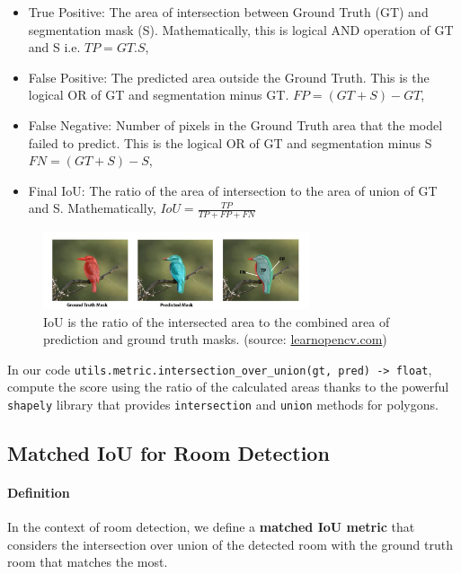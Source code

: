 \documentclass[11pt]{article}
\begin{document}
\begin{itemize}
    \item True Positive: The area of intersection between Ground Truth (GT) and segmentation mask (S). Mathematically, this is logical AND operation of GT and S i.e.
    $TP = GT.S$,
    \item False Positive: The predicted area outside the Ground Truth. This is the logical OR of GT and segmentation minus GT.
    $FP=(GT+S) - GT$,
    \item False Negative: Number of pixels in the Ground Truth area that the model failed to predict. This is the logical OR of GT and segmentation minus S
    $FN=(GT+S) -S$,
    \item Final IoU: The ratio of the area of intersection to the area of union of GT and S. Mathematically,
    $IoU = \frac{TP}{TP+FP+FN}$
\end{itemize}

\begin{figure}[hb!]
    \centering
    \includegraphics[width=0.7\textwidth]{figures/5-segmentation-iou.jpg}
    \caption{IoU is the ratio of the intersected area to the combined area of
     prediction and ground truth masks. 
     (source: \href{https://learnopencv.com/intersection-over-union-iou-in-object-detection-and-segmentation/}
        {learnopencv.com})}
    \label{fig:iou_segmentation}
\end{figure}

In our code \texttt{utils.metric.intersection\_over\_union(gt, pred) -> float},
compute the score using the ratio of the calculated areas thanks to the powerful
\texttt{shapely} library that provides \texttt{intersection} and \texttt{union} 
methods for polygons.

\subsection{Matched IoU for Room Detection}
\paragraph{Definition} In the context of room detection, we define a \textbf{matched IoU
metric} that considers the intersection over union of the detected room with the
ground truth room that matches the most. 
\end{document}
